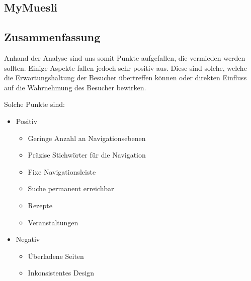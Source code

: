 \documentclass[12pt,a4paper,oneside,ngerman]{article}
\begin{document}
\subsection{MyMuesli} %

\subsection{Zusammenfassung}
Anhand der Analyse sind uns somit Punkte aufgefallen, die vermieden werden sollten. Einige Aspekte fallen jedoch sehr positiv aus. Diese sind solche, welche die Erwartungshaltung der Besucher übertreffen können oder direkten Einfluss auf die Wahrnehmung des Besucher bewirken.

Solche Punkte sind:
\begin{itemize}

\item{Positiv}
\begin{itemize} %
\item{Geringe Anzahl an Navigationsebenen}
\item{Präzise Stichwörter für die Navigation}
\item{Fixe Navigationsleiste}
\item{Suche permanent erreichbar}
\item{Rezepte}
\item{Veranstaltungen} 
\end{itemize}

\item{Negativ}
\begin{itemize} %
\item{Überladene Seiten}
\item{Inkonsistentes Design}
\end{itemize}

\end{itemize}
\end{document}
